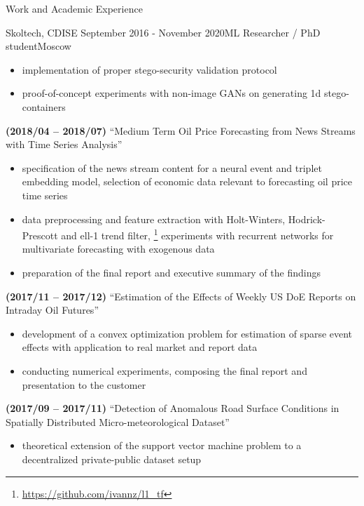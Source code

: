 \documentclass{resume} %
\begin{document}
\begin{rSection}{Work and Academic Experience}
\begin{rSubsection}{
        Skoltech, CDISE
    }{September 2016 - November 2020}{ML Researcher / PhD student}{Moscow}
\begin{itemize}
        \item implementation of proper stego-security validation protocol

        \item proof-of-concept experiments with non-image GANs on generating 1d stego-containers
    \end{itemize}

    \item \textbf{(2018/04 -- 2018/07)}
    ``Medium Term Oil Price Forecasting from News Streams with Time Series Analysis''
    \begin{itemize}
        \item specification of the news stream content for a neural event and triplet embedding model, selection of economic data relevant to forecasting oil price time series

        \item data preprocessing and feature extraction with Holt-Winters, Hodrick-Prescott and ell-1 trend filter,%
        \footnote{
            \url{https://github.com/ivannz/l1_tf}
        }
        experiments with recurrent networks for multivariate forecasting with exogenous data

        \item preparation of the final report and executive summary of the findings
    \end{itemize}

    \item \textbf{(2017/11 -- 2017/12)}
    ``Estimation of the Effects of Weekly US DoE Reports on Intraday Oil Futures''
    \begin{itemize}
        \item development of a convex optimization problem for estimation of sparse event effects with application to real market and report data

        \item conducting numerical experiments, composing the final report and presentation to the customer
    \end{itemize}

    \item \textbf{(2017/09 -- 2017/11)}
    ``Detection of Anomalous Road Surface Conditions in Spatially Distributed Micro-meteorological Dataset''
    \begin{itemize}
        \item theoretical extension of the support vector machine problem to a decentralized private-public dataset setup


\end{itemize}
\end{rSubsection}
\end{rSection}
\end{document}
